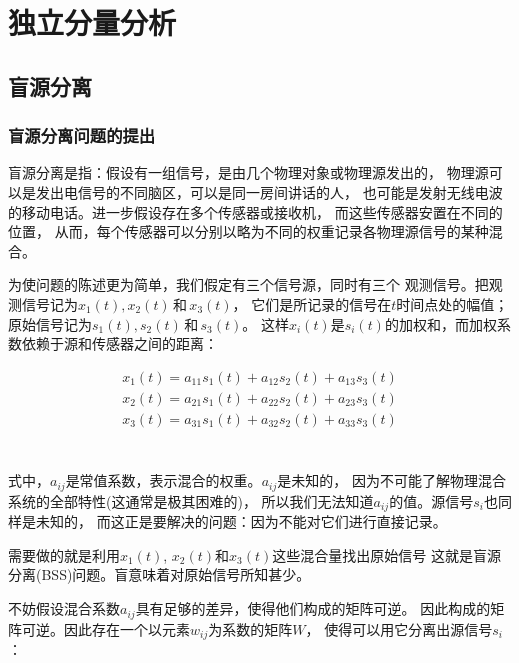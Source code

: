 ﻿%

\chapter{独立分量分析}
\label{chap02}
\section{盲源分离}

\subsection{盲源分离问题的提出}
盲源分离是指：假设有一组信号，是由几个物理对象或物理源发出的，
物理源可以是发出电信号的不同脑区，可以是同一房间讲话的人，
也可能是发射无线电波的移动电话。进一步假设存在多个传感器或接收机，
而这些传感器安置在不同的位置，
从而，每个传感器可以分别以略为不同的权重记录各物理源信号的某种混合。

为使问题的陈述更为简单，我们假定有三个信号源，同时有三个
观测信号。把观测信号记为$x_1(t), x_2(t) \,\mbox{和}\, x_3(t)$，
它们是所记录的信号在$t$时间点处的幅值；
原始信号记为$s_1(t), s_2(t)\,和\,s_3(t)$。
这样$x_i(t)$是$s_i(t)$的加权和，而加权系数依赖于源和传感器之间的距离：

\parbox{10cm}{
\begin{eqnarray*}
x_1(t)=a_{11}s_1(t)+a_{12}s_2(t)+a_{13}s_3(t) \\
x_2(t)=a_{21}s_1(t)+a_{22}s_2(t)+a_{23}s_3(t) \\
x_3(t)=a_{31}s_1(t)+a_{32}s_2(t)+a_{33}s_3(t) \\
\end{eqnarray*}
}\hfill
\parbox{3cm}{\begin{eqnarray} \label{bss_compose}\end{eqnarray}}

式中，$a_{ij}$是常值系数，表示混合的权重。$a_{ij}$是未知的，
因为不可能了解物理混合系统的全部特性(这通常是极其困难的)，
所以我们无法知道$a_{ij}$的值。源信号$s_i$也同样是未知的，
而这正是要解决的问题：因为不能对它们进行直接记录。
    
需要做的就是利用$x_1(t)$, $x_2(t)$和$x_3(t)$这些混合量找出原始信号
这就是盲源分离(BSS)问题。盲意味着对原始信号所知甚少。

不妨假设混合系数$a_{ij}$具有足够的差异，使得他们构成的矩阵可逆。
因此构成的矩阵可逆。因此存在一个以元素$w_{ij}$为系数的矩阵$W$，
使得可以用它分离出源信号$s_i$：
 
